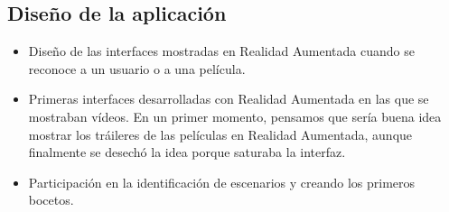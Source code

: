             \subsection{Diseño de la aplicación}
            \label{makereference7.3.2}
                \begin{itemize}
                    \item Diseño de las interfaces mostradas en Realidad Aumentada cuando se reconoce a un usuario o a una película. 
                    \item Primeras interfaces desarrolladas con Realidad Aumentada en las que se mostraban vídeos. En un primer momento, 
                    pensamos que sería buena idea mostrar los tráileres de las películas en Realidad Aumentada, aunque finalmente se desechó la idea porque saturaba la interfaz.
                    \item Participación en la identificación de escenarios y creando los primeros bocetos.
                \end{itemize}
